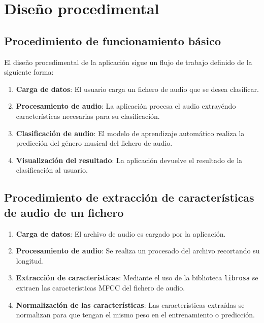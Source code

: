\section{Diseño procedimental}

\subsection{Procedimiento de funcionamiento básico}

El diseño procedimental de la aplicación sigue un flujo de trabajo definido de la siguiente forma:

\begin{enumerate}
\tightlist

\item \textbf{Carga de datos}: El usuario carga un fichero de audio que se desea clasificar.

\item \textbf{Procesamiento de audio}: La aplicación procesa el audio extrayéndo características necesarias para su clasificación.

\item \textbf{Clasificación de audio}: El modelo de aprendizaje automático realiza la predicción del género musical del fichero de audio.

\item \textbf{Visualización del resultado}: La aplicación devuelve el resultado de la clasificación al usuario.

\end{enumerate}


\subsection{Procedimiento de extracción de características de audio de un fichero}

\begin{enumerate}
\tightlist

\item \textbf{Carga de datos}: El archivo de audio es cargado por la aplicación.

\item \textbf{Procesamiento de audio}: Se realiza un procesado del archivo recortando su longitud.

\item \textbf{Extracción de características}: Mediante el uso de la biblioteca \texttt{librosa} se extraen las características MFCC del fichero de audio.

\item \textbf{Normalización de las características}: Las características extraídas se normalizan para que tengan el mismo peso en el entrenamiento o predicción.

\end{enumerate}

